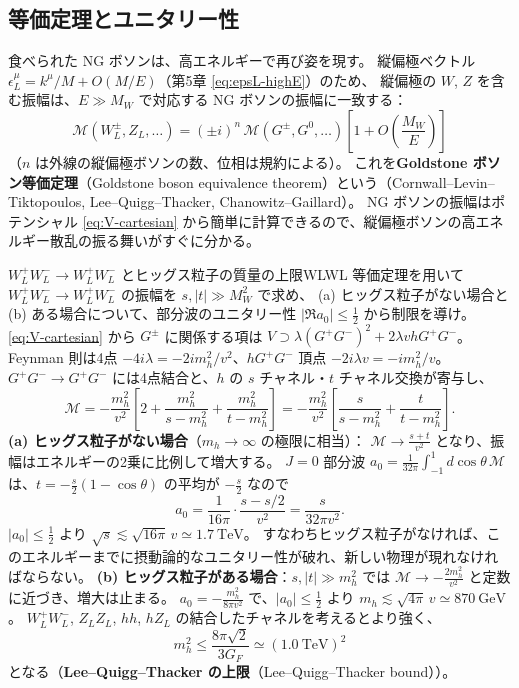 \documentclass[uplatex,dvipdfmx,a4paper,11pt,openany]{jsbook}
\newcommand{\term}[2]{\textbf{#1}（#2）}
\numberwithin{equation}{chapter}
\theoremstyle{definition}
\theoremstyle{plain}
\theoremstyle{remark}
\begin{document}
\subsection{等価定理とユニタリー性}
\label{subsec:unitarity}
食べられた NG ボソンは、高エネルギーで再び姿を現す。
縦偏極ベクトル $\epsilon_L^\mu=k^\mu/M+O(M/E)$（第5章 \eqref{eq:epsL-highE}）のため、
縦偏極の $W$, $Z$ を含む振幅は、$E\gg M_W$ で対応する NG ボソンの振幅に一致する：
\begin{equation}
\mathcal M\left(W_L^\pm,Z_L,\dots\right)=(\pm i)^n\,\mathcal M\left(G^\pm,G^0,\dots\right)\left[1+O\!\left(\frac{M_W}{E}\right)\right]
\label{eq:equivalence-theorem}
\end{equation}
（$n$ は外線の縦偏極ボソンの数、位相は規約による）。
これを\term{Goldstone ボソン等価定理}{Goldstone boson equivalence theorem}という（Cornwall--Levin--Tiktopoulos, Lee--Quigg--Thacker, Chanowitz--Gaillard）。
NG ボソンの振幅はポテンシャル \eqref{eq:V-cartesian} から簡単に計算できるので、縦偏極ボソンの高エネルギー散乱の振る舞いがすぐに分かる。
\begin{myex}{$W_L^+W_L^-\to W_L^+W_L^-$ とヒッグス粒子の質量の上限}{WLWL}
等価定理を用いて $W_L^+W_L^-\to W_L^+W_L^-$ の振幅を $s,|t|\gg M_W^2$ で求め、
(a) ヒッグス粒子がない場合と (b) ある場合について、部分波のユニタリー性 $|\Re a_0|\le\frac12$ から制限を導け。
\tcblower
\eqref{eq:V-cartesian} から $G^\pm$ に関係する項は $V\supset\lambda(G^+G^-)^2+2\lambda vhG^+G^-$。
Feynman 則は4点 $-4i\lambda=-2im_h^2/v^2$、$hG^+G^-$ 頂点 $-2i\lambda v=-im_h^2/v$。
$G^+G^-\to G^+G^-$ には4点結合と、$h$ の $s$ チャネル・$t$ チャネル交換が寄与し、
\[
\mathcal M=-\frac{m_h^2}{v^2}\left[2+\frac{m_h^2}{s-m_h^2}+\frac{m_h^2}{t-m_h^2}\right]
=-\frac{m_h^2}{v^2}\left[\frac{s}{s-m_h^2}+\frac{t}{t-m_h^2}\right].
\]
\textbf{(a) ヒッグス粒子がない場合}（$m_h\to\infty$ の極限に相当）：
$\mathcal M\to\frac{s+t}{v^2}$ となり、振幅はエネルギーの2乗に比例して増大する。
$J=0$ 部分波 $a_0=\frac{1}{32\pi}\int_{-1}^1d\cos\theta\,\mathcal M$ は、$t=-\frac s2(1-\cos\theta)$ の平均が $-\frac s2$ なので
\[
a_0=\frac{1}{16\pi}\cdot\frac{s-s/2}{v^2}=\frac{s}{32\pi v^2}.
\]
$|a_0|\le\frac12$ より $\sqrt s\lesssim\sqrt{16\pi}\,v\simeq1.7\ \mathrm{TeV}$。
すなわちヒッグス粒子がなければ、このエネルギーまでに摂動論的なユニタリー性が破れ、新しい物理が現れなければならない。
\textbf{(b) ヒッグス粒子がある場合}：$s,|t|\gg m_h^2$ では $\mathcal M\to-\frac{2m_h^2}{v^2}$ と定数に近づき、増大は止まる。
$a_0=-\frac{m_h^2}{8\pi v^2}$ で、$|a_0|\le\frac12$ より $m_h\lesssim\sqrt{4\pi}\,v\simeq870\ \mathrm{GeV}$。
$W_L^+W_L^-$, $Z_LZ_L$, $hh$, $hZ_L$ の結合したチャネルを考えるとより強く、
\[
m_h^2\le\frac{8\pi\sqrt2}{3G_F}\simeq(1.0\ \mathrm{TeV})^2
\]
となる（\term{Lee--Quigg--Thacker の上限}{Lee--Quigg--Thacker bound}）。
\end{myex}
\end{document}
